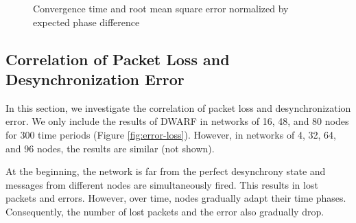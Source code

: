 \begin{figure}[!t]
\centerline{
	\hfil
	\hfil
}
\caption{Convergence time and root mean square error normalized by expected phase difference}
\label{fig:nrmse-convergence}
\lofcont
\end{figure}

\subsection{Correlation of Packet Loss and Desynchronization Error }
In this section, we investigate the correlation of packet loss and desynchronization error. 
We only include the results of DWARF in networks of 16, 48, and 80 nodes for 300 time periods (Figure \ref{fig:error-loss}). 
However, in networks of 4, 32, 64, and 96 nodes, the results are similar (not shown).

At the beginning, the network is far from the perfect desynchrony state and messages from different nodes are simultaneously fired. 
This results in lost packets and errors.
However, over time, nodes gradually adapt their time phases. 
Consequently, the number of lost packets and the error also gradually drop.


